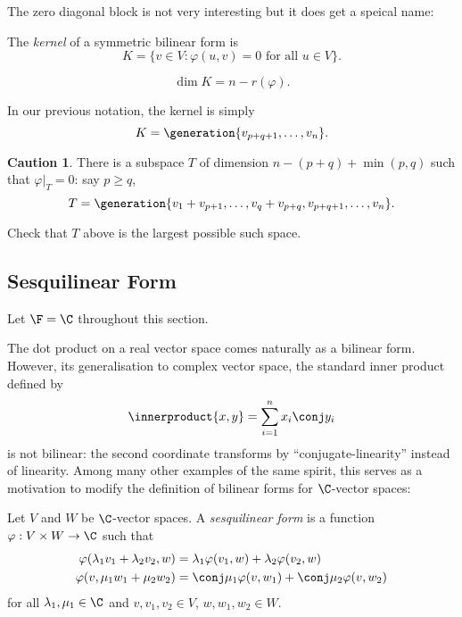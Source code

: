 \documentclass[a4paper]{article}
\newcommand*{\spans}{\generation}
\newcommand*{\ip}{\innerproduct}
\theoremstyle{definition}
\newtheorem*{caution}{Caution}
\begin{document}
The zero diagonal block is not very interesting but it does get a speical name:

\begin{definition}
  The \emph{kernel} of a symmetric bilinear form is
  \[
    K = \{ v \in V: \varphi(u, v) = 0 \text{ for all } u \in V\}.
  \]
\end{definition}

\begin{note}
  \[
    \dim K = n - r(\varphi).
  \]
\end{note}

In our previous notation, the kernel is simply
\[
  K = \spans{v_{p + q + 1}, \dots, v_n}.
\]

\begin{caution}
  There is a subspace \(T\) of dimension \(n - (p + q) + \min(p, q)\) such that \(\varphi|_T = 0\): say \(p \geq q\),
  \[
    T = \spans{v_1 + v_{p + 1}, \dots, v_q + v_{p + q}, v_{p + q + 1}, \dots, v_n}.
  \]
\end{caution}

\begin{ex}
  Check that \(T\) above is the largest possible such space.
\end{ex}

\subsection{Sesquilinear Form}

Let \(\F = \C\) throughout this section.

The dot product on a real vector space comes naturally as a bilinear form. However, its generalisation to complex vector space, the standard inner product defined by
\[
  \ip{x, y} = \sum_{i = 1}^{n} x_i \conj y_i
\]
is not bilinear: the second coordinate transforms by ``conjugate-linearity'' instead of linearity. Among many other examples of the same spirit, this serves as a motivation to modify the definition of bilinear forms for \(\C\)-vector spaces:

\begin{definition}
  Let \(V\) and \(W\) be \(\C\)-vector spaces. A \emph{sesquilinear form} is a function \(\varphi: V \times W \to \C\) such that
  \begin{align*}
    \varphi(\lambda_1v_1 + \lambda_2v_2, w) &= \lambda_1 \varphi(v_1, w) + \lambda_2 \varphi(v_2, w) \\
    \varphi(v, \mu_1w_1 + \mu_2w_2) &= \conj \mu_1 \varphi(v, w_1) + \conj \mu_2 \varphi(v, w_2)
  \end{align*}
  for all \(\lambda_1, \mu_1 \in \C\) and \(v, v_1, v_2 \in V\), \(w, w_1, w_2 \in W\).
\end{definition}
\end{document}
